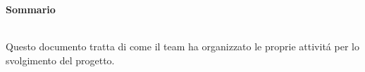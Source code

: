 \noindent\begin{Large}\textbf{Sommario}\end{Large}\\

\noindent Questo documento tratta di come il team \gruppo ha organizzato le proprie attivit\'a per lo svolgimento del progetto. \\